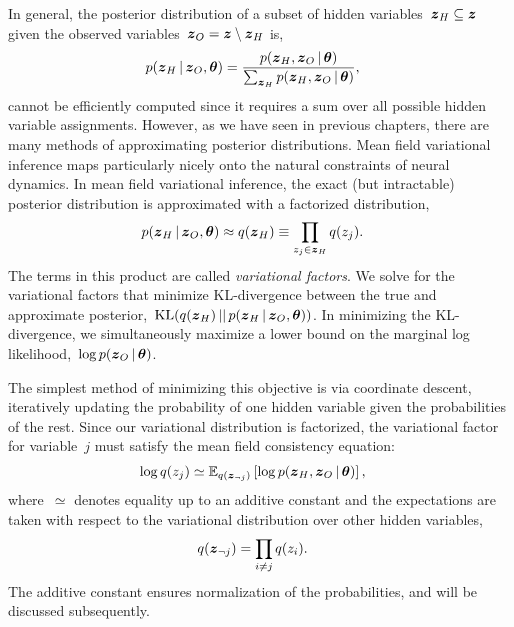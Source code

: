 In general, the posterior distribution of a subset of hidden
variables~$\boldsymbol{z}_H \subseteq \boldsymbol{z}$ 
given the observed variables~$\boldsymbol{z}_O = \boldsymbol{z} \setminus \boldsymbol{z}_H$ is,
\begin{align}
  p(\boldsymbol{z}_H \,|\, \boldsymbol{z}_O, \boldsymbol{\theta}) &=
  \frac{p(\boldsymbol{z}_H, \boldsymbol{z}_O \,|\, \boldsymbol{\theta})}
       {\sum_{\boldsymbol{z}_H} p(\boldsymbol{z}_H, \boldsymbol{z}_O \,|\, \boldsymbol{\theta})},
\end{align}
cannot be efficiently computed since it requires a sum over all
possible hidden variable assignments.
However, as we have seen in previous chapters, there are many methods of
approximating posterior distributions. Mean field variational
inference  maps particularly nicely onto the natural constraints
of neural dynamics. 
In mean field variational inference, the exact (but intractable)
posterior distribution is approximated with a factorized
distribution,
\begin{align}
  p(\boldsymbol{z}_H \,|\, \boldsymbol{z}_O, \boldsymbol{\theta}) &\approx q(\boldsymbol{z}_H) \equiv \prod_{z_j \in \boldsymbol{z}_H} q(z_j).
\end{align}
The terms in this product are called \emph{variational factors}.  We
solve for the variational factors that minimize KL-divergence between
the true and approximate posterior,~$\mathrm{KL}(q(\boldsymbol{z}_H) \,||\, p(\boldsymbol{z}_H
\,|\, \boldsymbol{z}_O, \boldsymbol{\theta}))$. In minimizing the KL-divergence, we
simultaneously maximize a lower bound on the marginal log
likelihood,~$\log p(\boldsymbol{z}_O \,|\, \boldsymbol{\theta})$.

The simplest method of minimizing this objective is via coordinate
descent, iteratively updating the probability of one hidden variable
given the probabilities of the rest. Since our variational
distribution is factorized, the variational factor for variable~$j$
must satisfy the mean field consistency equation:
\begin{align}
  \label{eq:mf_consistency}
  \log q(z_j) &\simeq \mathbb{E}_{q(\boldsymbol{z}_{\neg j})}
  \left[ \log p(\boldsymbol{z}_H, \boldsymbol{z}_O \,|\, \boldsymbol{\theta}) \right],
\end{align}
where~$\simeq$ denotes equality up to an additive constant and the
expectations are taken with respect to the variational
distribution over other hidden variables,
\begin{align}
  q(\boldsymbol{z}_{\neg j}) &= \prod_{i \neq j} q(z_{i}).
\end{align}
The additive constant
ensures normalization of the probabilities, and will be discussed
subsequently.  

